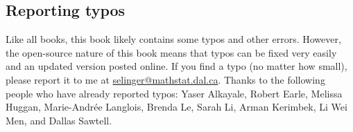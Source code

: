 \subsection*{Reporting typos}

Like all books, this book likely contains some typos and other
errors. However, the open-source nature of this book means that typos
can be fixed very easily and an updated version posted online. If you
find a typo (no matter how small), please report it to me at
\href{mailto:selinger@mathstat.dal.ca}{selinger@mathstat.dal.ca}. Thanks
to the following people who have already reported typos: Yaser
Alkayale, Robert Earle, Melissa Huggan, Marie-Andr\'ee Langlois,
Brenda Le, Sarah Li, Arman Kerimbek, Li Wei Men, and Dallas Sawtell.
